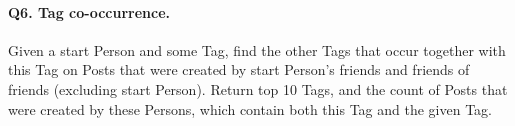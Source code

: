 \paragraph{\textbf{Q6}. Tag co-occurrence.}
Given a start Person and some Tag, find the other Tags that occur
together with this Tag on Posts that were created by start Person's
friends and friends of friends (excluding start Person). Return top 10
Tags, and the count of Posts that were created by these Persons, which
contain both this Tag and the given Tag.
